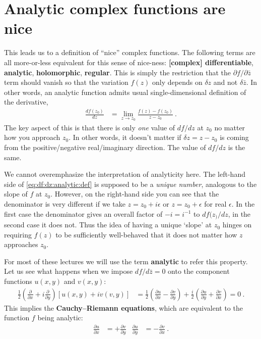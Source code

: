 \section{Analytic complex functions are nice}

This leads us to a definition of ``nice'' complex functions. The following terms are all more-or-less equivalent for this sense of nice-ness: \textbf{[complex] differentiable}, \textbf{analytic}, \textbf{holomorphic}, \textbf{regular}. This is simply the restriction that the $\partial f/\partial \bar z$ term should vanish so that the variation $f(z)$ only depends on $\delta z$ and not $\delta\bar z$. In other words, an analytic function admits usual single-dimensional definition of the derivative,
\begin{align}
  \frac{df(z_0)}{dz} &= \lim_{z\to z_0} \frac{f(z)-f(z_0)}{z-z_0} \ .
  \label{eq:df:dz:analytic:def}
\end{align}
The key aspect of this is that there is only \emph{one} value of $df/dz$ at $z_0$ no matter how you approach $z_0$. In other words, it doesn't matter if $\delta z = z-z_0$ is coming from the positive/negative real/imaginary direction. The value of $df/dz$ is the same. 

\begin{example}
We cannot overemphasize the interpretation of analyticity here. The left-hand side of \eqref{eq:df:dz:analytic:def} is supposed to be a \emph{unique number}, analogous to the slope of $f$ at $z_0$. However, on the right-hand side you can see that the denominator is very different if we take $z = z_0+ i \epsilon$ or $z= z_0 + \epsilon$ for real $\epsilon$. In the first case the denominator gives an overall factor of $-i = i^{-1}$ to $df(z_)/dz$, in the second case it does not. Thus the idea of having a unique `slope' at $z_0$ hinges on requiring $f(z)$ to be sufficiently well-behaved that it does not matter how $z$ approaches $z_0$.
\end{example}

For most of these lectures we will use the term \textbf{analytic} to refer this property. Let us see what happens when we impose $df/d\bar{z} = 0$ onto the component functions $u(x,y)$ and $v(x,y)$:
\begin{align}
  \frac{1}{2}\left(\frac{\partial}{\partial x} + i \frac{\partial}{\partial y}\right)
  \left[u(x,y)+iv(v,y)\right]
  &= 
  \frac{1}{2}
  \left( \frac{\partial u}{\partial x} - \frac{\partial v}{\partial y} \right)
  +
  \frac{i}{2}
  \left( \frac{\partial u}{\partial y} + \frac{\partial v}{\partial x} \right)
  = 0 \ .
\end{align}
This implies the \textbf{Cauchy--Riemann equations}, which are equivalent to the function $f$ being analytic:
\begin{align}
  \frac{\partial u}{\partial x} & = +\frac{\partial v}{\partial y}
  &
  \frac{\partial u}{\partial y} & = -\frac{\partial v}{\partial x} \ .
\end{align}

